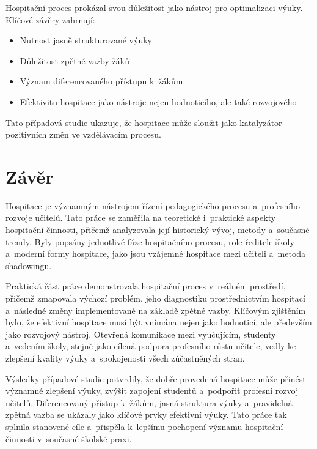 Hospitační proces prokázal svou důležitost jako nástroj pro optimalizaci výuky. Klíčové závěry zahrnují:

\begin{itemize}
    \item Nutnost jasně strukturované výuky
    \item Důležitost zpětné vazby žáků
    \item Význam diferencovaného přístupu k~žákům
    \item Efektivitu hospitace jako nástroje nejen hodnoticího, ale také rozvojového
\end{itemize}

Tato případová studie ukazuje, že hospitace může sloužit jako katalyzátor pozitivních změn ve vzdělávacím procesu.


\newpage
\section*{Závěr} 

Hospitace je významným nástrojem řízení pedagogického procesu a~profesního rozvoje učitelů. Tato práce se zaměřila na teoretické i~praktické aspekty hospitační činnosti, přičemž analyzovala její historický vývoj, metody a~současné trendy. Byly popsány jednotlivé fáze hospitačního procesu, role ředitele školy a~moderní formy hospitace, jako jsou vzájemné hospitace mezi učiteli a~metoda shadowingu.

Praktická část práce demonstrovala hospitační proces v~reálném prostředí, přičemž zmapovala výchozí problém, jeho diagnostiku prostřednictvím hospitací a~následné změny implementované na základě zpětné vazby. Klíčovým zjištěním bylo, že efektivní hospitace musí být vnímána nejen jako hodnoticí, ale především jako rozvojový nástroj. Otevřená komunikace mezi vyučujícím, studenty a~vedením školy, stejně jako cílená podpora profesního růstu učitele, vedly ke zlepšení kvality výuky a~spokojenosti všech zúčastněných stran.

Výsledky případové studie potvrdily, že dobře provedená hospitace může přinést významné zlepšení výuky, zvýšit zapojení studentů a~podpořit profesní rozvoj učitelů. Diferencovaný přístup k~žákům, jasná struktura výuky a~pravidelná zpětná vazba se ukázaly jako klíčové prvky efektivní výuky. Tato práce tak splnila stanovené cíle a~přispěla k~lepšímu pochopení významu hospitační činnosti v~současné školské praxi.
